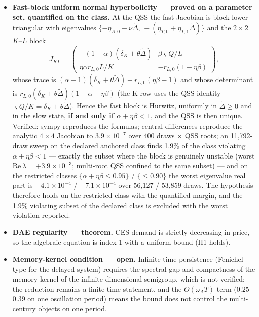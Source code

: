 \documentclass[
  10pt,
  a4paper,
]{article}
\providecommand{\tightlist}{%
  \setlength{\itemsep}{0pt}\setlength{\parskip}{0pt}}
\begin{document}
\begin{itemize}
\tightlist
\item
  \textbf{Fast-block uniform normal hyperbolicity --- proved on a
  parameter set, quantified on the class.} At the QSS the fast Jacobian
  is block lower-triangular with eigenvalues
  \(\{-\eta_{A,0}-\nu\tilde\Delta,\,-(\eta_{T,0}+\eta_{T,1}\tilde\Delta)\}\)
  and the \(2\times2\) \(K\)--\(L\) block
  \[J_{KL} = \begin{pmatrix} -(1-\alpha)(\delta_K+\theta\tilde\Delta) & \beta\varsigma Q/L \\ \eta\alpha r_{L,0} L/K & -r_{L,0}(1-\eta\beta) \end{pmatrix},\]
  whose trace is
  \((\alpha-1)(\delta_K+\theta\tilde\Delta) + r_{L,0}(\eta\beta-1)\) and
  whose determinant is
  \(r_{L,0}(\delta_K+\theta\tilde\Delta)(1-\alpha-\eta\beta)\) (the
  K-row uses the QSS identity
  \(\varsigma Q/K = \delta_K+\theta\tilde\Delta\)). Hence the fast block
  is Hurwitz, uniformly in \(\tilde\Delta\ge0\) and in the slow state,
  \textbf{if and only if \(\alpha+\eta\beta<1\)}, and the QSS is then
  unique. Verified: sympy reproduces the formulas; central differences
  reproduce the analytic \(4\times4\) Jacobian to \(3.9\times10^{-7}\)
  over 400 draws × QSS roots; an 11,792-draw sweep on the declared
  anchored class finds 1.9\% of the class violating
  \(\alpha+\eta\beta<1\) --- exactly the subset where the block is
  genuinely unstable (worst \(\mathrm{Re}\,\lambda=+3.9\times10^{-3}\);
  multi-root QSS confined to the same subset) --- and on the restricted
  classes \(\{\alpha+\eta\beta\le0.95\}\) / \(\{\le0.90\}\) the worst
  eigenvalue real part is \(-4.1\times10^{-4}\) / \(-7.1\times10^{-4}\)
  over 56,127 / 53,859 draws. The hypothesis therefore holds on the
  restricted class with the quantified margin, and the 1.9\% violating
  subset of the declared class is excluded with the worst violation
  reported.
\item
  \textbf{DAE regularity --- theorem.} CES demand is strictly decreasing
  in price, so the algebraic equation is index-1 with a uniform bound
  (H1 holds).
\item
  \textbf{Memory-kernel condition --- open.} Infinite-time persistence
  (Fenichel-type for the delayed system) requires the spectral gap and
  compactness of the memory kernel of the infinite-dimensional
  semigroup, which is not verified; the reduction remains a finite-time
  statement, and the \(O(\omega_A T)\) term (\(0.25\)--\(0.39\) on one
  oscillation period) means the bound does not control the multi-century
  objects on one period.
\end{itemize}
\end{document}
